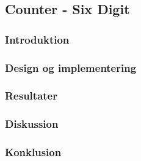 {
    \newcommand{\labelprefix}{src6-3}

\subsection{Counter - Six Digit}

\subsubsection{Introduktion}

\subsubsection{Design og implementering}

\subsubsection{Resultater}


\subsubsection{Diskussion}

\subsubsection{Konklusion}
   
}